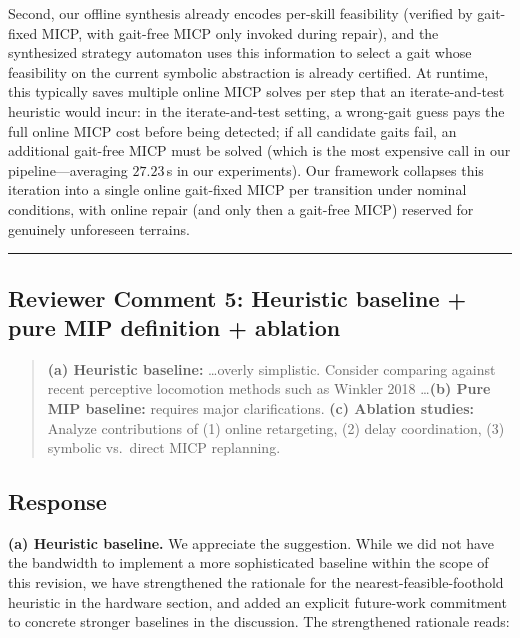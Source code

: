 Second, our offline synthesis already encodes per-skill feasibility (verified by gait-fixed MICP, with gait-free MICP only invoked during repair), and the synthesized strategy automaton uses this information to select a gait whose feasibility on the current symbolic abstraction is already certified. At runtime, this typically saves multiple online MICP solves per step that an iterate-and-test heuristic would incur: in the iterate-and-test setting, a wrong-gait guess pays the full online MICP cost before being detected; if all candidate gaits fail, an additional gait-free MICP must be solved (which is the most expensive call in our pipeline---averaging $27.23$\,s in our experiments). Our framework collapses this iteration into a single online gait-fixed MICP per transition under nominal conditions, with online repair (and only then a gait-free MICP) reserved for genuinely unforeseen terrains.

\noindent\rule{17cm}{2.0pt}

\subsection{Reviewer Comment 5: Heuristic baseline + pure MIP definition + ablation}
\begin{mdframed}
\begin{quote}
\textbf{(a) Heuristic baseline:} \ldots overly simplistic. Consider comparing against recent perceptive locomotion methods such as Winkler 2018 \ldots \textbf{(b) Pure MIP baseline:} requires major clarifications. \textbf{(c) Ablation studies:} Analyze contributions of (1) online retargeting, (2) delay coordination, (3) symbolic vs.\ direct MICP replanning.
\end{quote}
\end{mdframed}

\subsection{Response}
\textbf{(a) Heuristic baseline.} We appreciate the suggestion. While we did not have the bandwidth to implement a more sophisticated baseline within the scope of this revision, we have strengthened the rationale for the nearest-feasible-foothold heuristic in the hardware section, and added an explicit future-work commitment to concrete stronger baselines in the discussion. The strengthened rationale reads:

\textit{}

